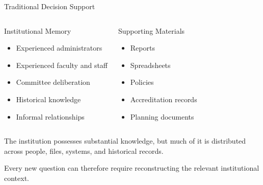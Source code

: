 \documentclass[aspectratio=169]{beamer}
\begin{document}
\begin{frame}{Traditional Decision Support}

\begin{columns}[T]


\begin{block}{Institutional Memory}

\begin{itemize}
\item Experienced administrators
\item Experienced faculty and staff
\item Committee deliberation
\item Historical knowledge
\item Informal relationships
\end{itemize}

\end{block}


\begin{block}{Supporting Materials}

\begin{itemize}
\item Reports
\item Spreadsheets
\item Policies
\item Accreditation records
\item Planning documents
\end{itemize}

\end{block}

\end{columns}

\vspace{0.4cm}

The institution possesses substantial knowledge, but much of it is
distributed across people, files, systems, and historical records.

\vspace{0.25cm}

Every new question can therefore require reconstructing the relevant
institutional context.

\end{frame}
\end{document}
